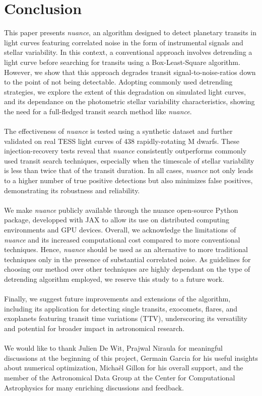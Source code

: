 \documentclass[modern]{aastex631}
\newcommand{\nuancemethod}{\textit{nuance}}
\newcommand{\nuancecode}{\textsf{nuance}}
\begin{document}
\section{Conclusion}\label{conclusion}
This paper presents \nuancemethod{}, an algorithm designed to detect planetary transits in light curves featuring correlated noise in the form of instrumental signals and stellar variability. In this context, a conventional approach involves detrending a light curve before searching for transits using a Box-Least-Square algorithm. However, we show that this approach degrades transit signal-to-noise-ratios down to the point of not being detectable. Adopting commonly used detrending strategies, we explore the extent of this degradation on simulated light curves, and its dependance on the photometric stellar variability characteristics, showing the need for a full-fledged transit search method like \nuancemethod{}.\\\\
The effectiveness of \nuancemethod{} is tested using a synthetic dataset and further validated on real TESS light curves of 438 rapidly-rotating M dwarfs. These injection-recovery tests reveal that \nuancemethod{} consistently outperforms commonly used transit search techniques, especially when the timescale of stellar variability is less than twice that of the transit duration. In all cases, \nuancemethod{} not only leads to a higher number of true positive detections but also minimizes false positives, demonstrating its robustness and reliability.\\\\
We make \nuancemethod{} publicly available through the \nuancecode{} open-source Python package, developped with \textsf{JAX} to allow its  use on distributed computing environments and GPU devices. Overall, we acknowledge the limitations of \nuancemethod{} and its increased computational cost compared to more conventional techniques. Hence, \nuancemethod{} should be used as an alternative to more traditional techniques only in the presence of substantial correlated noise. As guidelines for choosing our method over other techniques are highly dependant on the type of detrending algorithm employed, we reserve this study to a future work.\\\\
Finally, we suggest future improvements and extensions of the algorithm, including its application for detecting single transits, exocomets, flares, and exoplanets featuring transit time variations (TTV), underscoring its versatility and potential for broader impact in astronomical research.
\\\\
\vfill{}
We would like to thank Julien De Wit, Prajwal Niraula for meaningful discussions at the beginning of this project, Germain Garcia for his useful insights about numerical optimization, Michaël Gillon for his overall support, and the member of the Astronomical Data Group at the Center for Computational Astrophysics for many enriching discussions and feedback.
\end{document}
